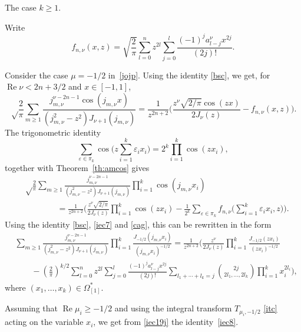 \documentclass[12pt,leqno]{amsart}
\numberwithin{equation}{section}
\theoremstyle{plain}
\newcommand{\eps}{\varepsilon}
\renewcommand{\Re}{\operatorname{Re}}
\begin{document}
The case $k\ge 1$.

Write
\begin{equation}
\label{iec7}
f_{n,\nu}(x,z)=\sqrt{\frac{2}{\pi}} \sum_{l=0}^nz^{2l} \sum_{j=0}^l
\frac{(-1)^ja_{l-j}^\nu x^{2j}}{(2j)!}.
\end{equation}

Consider the case $\mu=-1/2$ in~\eqref{jojp}. Using the identity \eqref{bsc}, we get, for $\Re \nu< 2n+3/2$ and $x\in[-1,1]$,
\begin{equation*}
\sqrt\frac{2}{\pi} \sum_{m\ge 1} \frac{j_{m,\nu}^{\nu-2n-1}
\cos(j_{m,\nu} x)}{(j_{m,\nu}^2-z^2)J_{\nu+1}(j_{m,\nu})}
= \frac{1}{z^{2n+2}} \bigg( \frac{z^{\nu}\sqrt{2/\pi}\cos(zx)}{2J_\nu(z)}-f_{n,\nu}(x,z) \bigg).
\end{equation*}
The trigonometric identity
\begin{equation*}
\sum_{\eps\in \pi_k} \cos\Big(z \sum_{i=1}^k\eps_ix_i\Big) = 2^k\prod_{i=1}^k\cos(zx_i),
\end{equation*}
together with Theorem~\ref{th:amcos} gives
\begin{align*}
& \sqrt\frac{2}{\pi} \sum_{m\ge 1} 
\frac{j_{m,\nu}^{\nu-2n-1}}{(j_{m,\nu}^2-z^2)J_{\nu+1}(j_{m,\nu})} 
\prod_{i=1}^k\cos(j_{m,\nu} x_i) \\
&\qquad\qquad = \frac{1}{z^{2n+2}} \Bigg( \frac{z^{\nu}\sqrt{2/\pi}}{2J_\nu(z)}
\prod_{i=1}^k\cos(zx_i) - \frac{1}{2^k} \sum_{\eps\in \pi_k}
f_{n,\nu} \Big( \sum_{i=1}^k\eps_ix_i,z\Big) \Bigg).
\end{align*}
Using the identity \eqref{bsc}, \eqref{iec7} and \eqref{cag}, this can be rewritten in the form
\begin{align}
\label{iec19j}
& \sum_{m\ge 1} \frac{j_{m,\nu}^{\nu-2n-1}}{(j_{m,\nu}^2-z^2)J_{\nu+1}(j_{m,\nu})}
\prod_{i=1}^k \frac{J_{-1/2}(j_{m,\nu} x_i)}{(j_{m,\nu} x_i)^{-1/2}}
= \frac{1}{z^{2n+2}} \Bigg(\frac{z^{\nu}}{2J_\nu(z)}
\prod_{i=1}^k \frac{J_{-1/2}(zx_i)}{(zx_i)^{-1/2}} \\
\nonumber
& \qquad -\left(\frac{2}{\pi}\right)^{k/2}
\sum_{l=0}^nz^{2l} \sum_{j=0}^l
\frac{(-1)^ja_{l-j}^\nu x^{2j}}{(2j)!} \sum_{l_1+\cdots+l_k=j}
\binom{2j}{2l_1,\ldots,2l_k}\prod_{i=1}^kx_i^{2l_i} \Bigg),
\end{align}
where $(x_1,\dots,x_k)\in \Omega^*_{[1]}$.

Assuming that $\Re \mu_i\ge -1/2$ and using the integral transform $T_{\mu_i,-1/2}$ \eqref{itc} acting on the variable $x_i$, we get from \eqref{iec19j} the identity~\eqref{iec8}.
\end{document}
